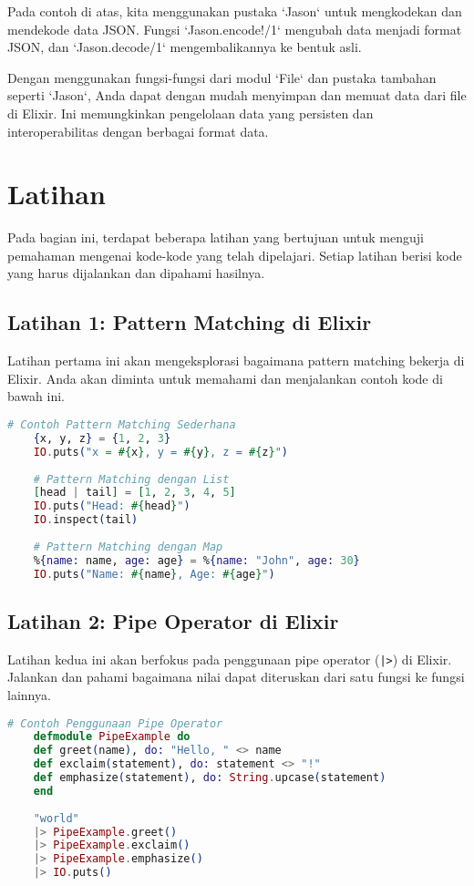 Pada contoh di atas, kita menggunakan pustaka `Jason` untuk mengkodekan dan mendekode data JSON. Fungsi `Jason.encode!/1` mengubah data menjadi format JSON, dan `Jason.decode/1` mengembalikannya ke bentuk asli.

Dengan menggunakan fungsi-fungsi dari modul `File` dan pustaka tambahan seperti `Jason`, Anda dapat dengan mudah menyimpan dan memuat data dari file di Elixir. Ini memungkinkan pengelolaan data yang persisten dan interoperabilitas dengan berbagai format data.


\section{Latihan}

Pada bagian ini, terdapat beberapa latihan yang bertujuan untuk menguji pemahaman mengenai kode-kode yang telah dipelajari. Setiap latihan berisi kode yang harus dijalankan dan dipahami hasilnya.

\subsection{Latihan 1: Pattern Matching di Elixir}

Latihan pertama ini akan mengeksplorasi bagaimana pattern matching bekerja di Elixir. Anda akan diminta untuk memahami dan menjalankan contoh kode di bawah ini.

\begin{lstlisting}[language=Elixir]
	# Contoh Pattern Matching Sederhana
	{x, y, z} = {1, 2, 3}
	IO.puts("x = #{x}, y = #{y}, z = #{z}")
	
	# Pattern Matching dengan List
	[head | tail] = [1, 2, 3, 4, 5]
	IO.puts("Head: #{head}")
	IO.inspect(tail)
	
	# Pattern Matching dengan Map
	%{name: name, age: age} = %{name: "John", age: 30}
	IO.puts("Name: #{name}, Age: #{age}")
\end{lstlisting}

\subsection{Latihan 2: Pipe Operator di Elixir}

Latihan kedua ini akan berfokus pada penggunaan pipe operator (\texttt{|>}) di Elixir. Jalankan dan pahami bagaimana nilai dapat diteruskan dari satu fungsi ke fungsi lainnya.

\begin{lstlisting}[language=Elixir]
	# Contoh Penggunaan Pipe Operator
	defmodule PipeExample do
	def greet(name), do: "Hello, " <> name
	def exclaim(statement), do: statement <> "!"
	def emphasize(statement), do: String.upcase(statement)
	end
	
	"world"
	|> PipeExample.greet()
	|> PipeExample.exclaim()
	|> PipeExample.emphasize()
	|> IO.puts()
\end{lstlisting}

